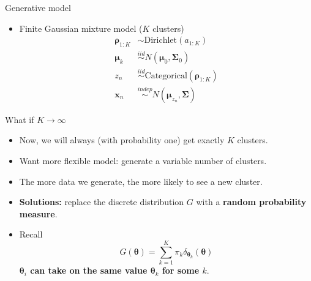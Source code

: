 \documentclass[10pt,mathserif]{beamer}
\begin{document}
\begin{frame}{Generative model}
\begin{itemize}
    \item Finite Gaussian mixture model ($K$ clusters)
    \begin{equation*}
        \begin{split}
            \bm{\rho}_{1:K} & \sim \text{Dirichlet}(a_{1:K})\\
            \bm{\mu}_k & \overset{iid}{\sim} N(\bm{\mu}_0,\bm{\Sigma}_0)\\
            z_n & \overset{iid}{\sim} \text{Categorical}(\bm{\rho}_{1:K})\\
            \bm{x}_n & \overset{indep}{\sim} N(\bm{\mu}_{z_n},\bm{\Sigma})
        \end{split}
    \end{equation*}
\end{itemize}    

\end{frame}

\begin{frame}{What if $K \rightarrow \infty$}
\begin{itemize}
    \item Now, we will always (with probability one) get exactly $K$ clusters.
    \item  Want more flexible model: generate a variable number of clusters.
    \item The more data we generate, the more likely to see a new cluster.
    \item \textbf{Solutions:} replace the discrete distribution $G$ with a \textbf{random probability measure}.
    \item Recall
    \begin{equation*}
        G(\bm{\theta}) = \sum_{k= 1}^K \pi_k\delta_{\bm{\theta}_k} (\bm{\theta})
    \end{equation*}
    \textbf{$\bm{\theta}_i$ can take on the same value $\bm{\theta}_k$ for some $k$}.
\end{itemize}    
\end{frame}
\end{document}

